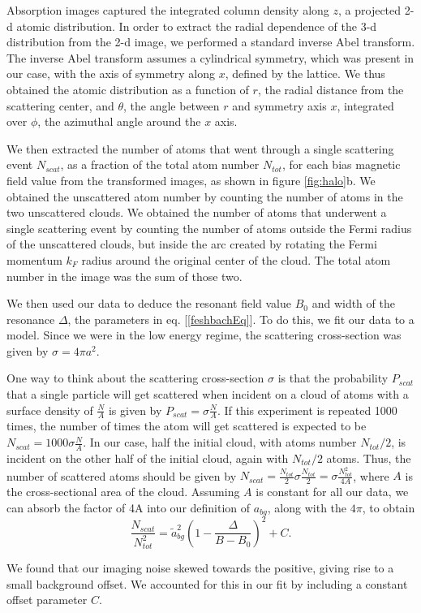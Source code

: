 \documentclass[12pt]{iopart}
\begin{document}
\par Absorption images captured the integrated column density along $z$, a projected 2-d atomic distribution. In order to extract the radial dependence of the 3-d distribution from the 2-d image, we performed a standard inverse Abel transform. The inverse Abel transform assumes a cylindrical symmetry, which was present in our case, with the axis of symmetry along $x$, defined by the lattice. We thus obtained the atomic distribution as a function of $r$, the radial distance from the scattering center, and $\theta$, the angle between $r$ and symmetry axis $x$, integrated over $\phi$, the azimuthal angle around the $x$ axis. 
\par We then extracted the number of atoms that went through a single scattering event $N_{scat}$, as a fraction of the total atom number $N_{tot}$, for each bias magnetic field value from the transformed images, as shown in figure \ref{fig:halo}b. We obtained the unscattered atom number by counting the number of atoms in the two unscattered clouds. We obtained the number of atoms that underwent a single scattering event by counting the number of atoms outside the Fermi radius of the unscattered clouds, but inside the arc created by rotating the Fermi momentum $k_F$ radius around the original center of the cloud. The total atom number in the image was the sum of those two.
\par We then used our data to deduce the resonant field value $B_0$ and width of the resonance  $\Delta$, the parameters in eq. [\ref{feshbachEq}]. To do this, we fit our data to a model. Since we were in the low energy regime, the scattering cross-section was given by $\sigma=4\pi a^2$. 
\par One way to think about the scattering cross-section $\sigma$ is that the probability $P_{scat}$ that a single particle will get scattered when incident on a cloud of atoms with a surface density of $\frac{N}{A}$ is given by $P_{scat}=\sigma \frac{N}{A}$. If this experiment is repeated 1000 times, the number of times the atom will get scattered is expected to be $N_{scat}=1000 \sigma \frac{N}{A}$.  In our case, half the initial cloud, with atoms number $N_{tot}/2$, is incident on the other half of the initial cloud, again with $N_{tot}/2$ atoms. Thus, the number of scattered atoms should be given by $N_{scat}=\frac{N_{tot}}{2} \sigma \frac{N_{tot}}{2}=\sigma \frac{N_{tot}^2}{4A}$, where $A$ is the cross-sectional area of the cloud. Assuming $A$ is constant for all our data, we can absorb the factor of 4A into our definition of $a_{bg}$, along with the $4\pi$, to obtain
\begin{equation}
\frac{N_{scat}}{N_{tot}^2}=\tilde{a}_{bg}^2\left(1-\frac{\Delta}{B-B_0}\right)^2 + C.
\label{eq:fit}
\end{equation}
\par We found that our imaging noise skewed towards the positive, giving rise to a small background offset. We accounted for this in our fit by including a constant offset parameter $C$. 
\end{document}
